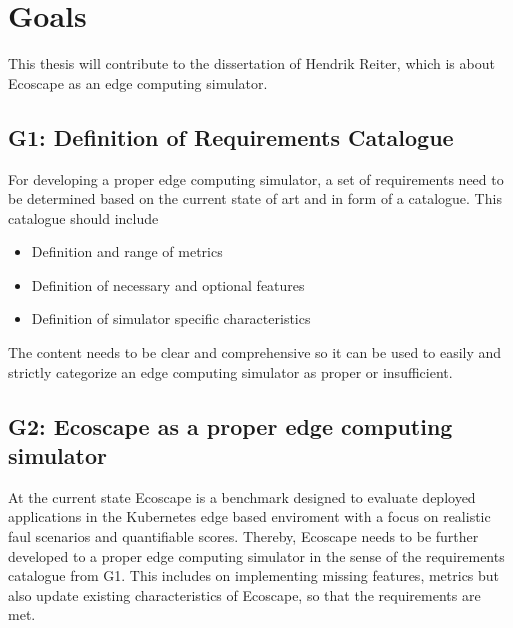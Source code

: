 \chapter{Goals}
This thesis will contribute to the dissertation of Hendrik Reiter, which is about Ecoscape as an edge computing simulator.

\section{G1: Definition of Requirements Catalogue}\label{goal-def-of-req-catalogue}
For developing a proper edge computing simulator, a set of requirements need to be determined based on the current state of art and in form of a catalogue.
This catalogue should include
\begin{itemize}
  \item Definition and range of metrics
  \item Definition of necessary and optional features
  \item Definition of simulator specific characteristics
\end{itemize}
The content needs to be clear and comprehensive so it can be used to easily and strictly categorize an edge computing simulator as proper or insufficient.

\section{G2: Ecoscape as a proper edge computing simulator}
At the current state Ecoscape is a benchmark designed to evaluate deployed applications in the Kubernetes edge based enviroment with a focus on realistic faul scenarios and quantifiable scores.
Thereby, Ecoscape needs to be further developed to a proper edge computing simulator in the sense of the requirements catalogue from G1.
This includes on implementing missing features, metrics but also update existing characteristics of Ecoscape, so that the requirements are met.